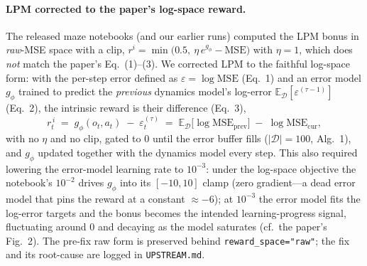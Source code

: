 \documentclass[11pt]{article}
\begin{document}
\paragraph{LPM corrected to the paper's log-space reward.} The released maze notebooks (and our
earlier runs) computed the LPM bonus in \emph{raw}-MSE space with a clip,
$r^i=\min\!\big(0.5,\ \eta\,e^{g_\phi}-\mathrm{MSE}\big)$ with $\eta{=}1$, which does \emph{not} match
the paper's Eq.~(1)--(3). We corrected LPM to the faithful log-space form: with the per-step error
defined as $\varepsilon=\log\mathrm{MSE}$ (Eq.~1) and an error model $g_\phi$ trained to predict the
\emph{previous} dynamics model's log-error $\mathbb{E}_{\mathcal D}[\varepsilon^{(\tau-1)}]$ (Eq.~2),
the intrinsic reward is their difference (Eq.~3),
\begin{equation}
  r^{\,i}_t \;=\; g_\phi(o_t,a_t)\;-\;\varepsilon^{(\tau)}_t
  \;=\; \mathbb{E}_{\mathcal D}\!\big[\log\mathrm{MSE}_{\text{prev}}\big]\;-\;\log\mathrm{MSE}_{\text{cur}},
  \label{eq:lpm}
\end{equation}
with no $\eta$ and no clip, gated to $0$ until the error buffer fills ($|\mathcal D|{=}100$, Alg.~1),
and $g_\phi$ updated together with the dynamics model every step. This also required lowering the
error-model learning rate to $10^{-3}$: under the log-space objective the notebook's $10^{-2}$ drives
$g_\phi$ into its $[-10,10]$ clamp (zero gradient---a dead error model that pins the reward at a
constant $\approx-6$); at $10^{-3}$ the error model fits the log-error targets and the bonus becomes
the intended learning-progress signal, fluctuating around $0$ and decaying as the model saturates
(cf.\ the paper's Fig.~2). The pre-fix raw form is preserved behind \texttt{reward\_space="raw"}; the
fix and its root-cause are logged in \texttt{UPSTREAM.md}.
\end{document}
